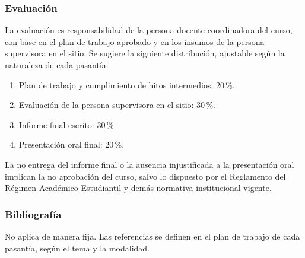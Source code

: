 \begin{refsection}
\subsubsection*{Evaluación}

La evaluación es responsabilidad de la persona docente coordinadora del curso, con base en el plan de trabajo aprobado y en los insumos de la persona supervisora en el sitio. Se sugiere la siguiente distribución, ajustable según la naturaleza de cada pasantía:

\begin{enumerate}
\item Plan de trabajo y cumplimiento de hitos intermedios: 20\,\%.
\item Evaluación de la persona supervisora en el sitio: 30\,\%.
\item Informe final escrito: 30\,\%.
\item Presentación oral final: 20\,\%.
\end{enumerate}

La no entrega del informe final o la ausencia injustificada a la presentación oral implican la no aprobación del curso, salvo lo dispuesto por el Reglamento del Régimen Académico Estudiantil y demás normativa institucional vigente.

\subsubsection*{Bibliografía}

No aplica de manera fija. Las referencias se definen en el plan de trabajo de cada pasantía, según el tema y la modalidad.

\end{refsection}
